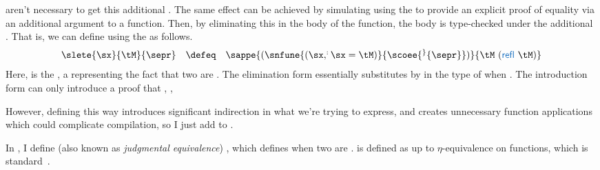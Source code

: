 \begin{digression}
   aren't necessary to get this additional .
  The same effect can be achieved by simulating  using the
   to provide an explicit proof of equality \im{\sx = \se}
  via an additional argument to a function.
  Then, by eliminating this in the body of the function, the body is
  type-checked under the additional .
  That is, we can define \im{\slete{\sx}{\se}{\sepr}} using the  as follows.
  \begin{displaymath}
    \begin{array}{rcl}
      \slete{\sx}{\se}{\sepr} & \defeq & \sappe{(\snfune{(\sx,\sp:\sx = \se)}{\scoee{\sp}{\sepr}})}{\se~(\sfont{refl}~{\se})}
    \end{array}
  \end{displaymath}
  Here, \im{\sx = \se} is the , a 
  representing the fact that two  are .
  The elimination form \im{\scoee{\sp}{\sepr}} essentially substitutes \im{\sx}
  by \im{\se} in the type of \im{\sepr} when \im{\sp : \sx = \se}.
  The introduction form  can only introduce a proof that
  \im{\se = \se}, \ie, 

  However, defining  this way introduces significant indirection
  in what we're trying to express, and creates unnecessary function applications
  which could complicate compilation, so I just add  to \slang.
\end{digression}

\FigECCEqv
In , I define  (also known as \emph{judgmental
  equivalence}) \im{\sequivjudg{\slenv}{\se}{\sepr}},
which defines when two  are .
 is defined as  up to
\(\eta\)-equivalence on functions, which is standard~\cite{luo1989}.

